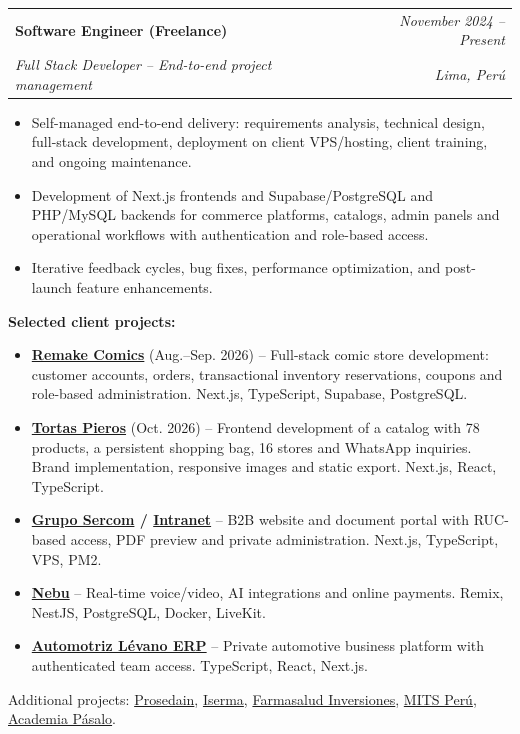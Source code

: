 \documentclass[a4paper,10pt]{article}
\makeatletter
\newcommand{\cvsubheading}[4]{
  \vspace{2pt}
  \begin{tabularx}{\textwidth}{@{}X r@{}}
    \textbf{#1} & \textit{\small #2} \\
    \textit{\small\color{graytext} #3} & \textit{\small\color{graytext} #4} \\
  \end{tabularx}\vspace{-2pt}
}
\makeatother
\begin{document}
\cvsubheading
  {Software Engineer (Freelance)}{November 2024 -- Present}
  {Full Stack Developer -- End-to-end project management}{Lima, Per\'u}

\begin{itemize}[leftmargin=16pt, itemsep=1.5pt, parsep=0pt, topsep=3pt]
  \item Self-managed end-to-end delivery: requirements analysis, technical design, full-stack development, deployment on client VPS/hosting, client training, and ongoing maintenance.
  \item Development of Next.js frontends and Supabase/PostgreSQL and PHP/MySQL backends for commerce platforms, catalogs, admin panels and operational workflows with authentication and role-based access.
  \item Iterative feedback cycles, bug fixes, performance optimization, and post-launch feature enhancements.
\end{itemize}

\vspace{2pt}
{\small\textbf{Selected client projects:}}
\begin{itemize}[leftmargin=16pt, itemsep=1.5pt, parsep=0pt, topsep=2pt]
  \item \textbf{\href{https://remake.johanamador.com/}{Remake Comics}} (Aug.--Sep. 2026) -- Full-stack comic store development: customer accounts, orders, transactional inventory reservations, coupons and role-based administration. Next.js, TypeScript, Supabase, PostgreSQL.
  \item \textbf{\href{https://pieros.johanamador.com/}{Tortas Pieros}} (Oct. 2026) -- Frontend development of a catalog with 78 products, a persistent shopping bag, 16 stores and WhatsApp inquiries. Brand implementation, responsive images and static export. Next.js, React, TypeScript.
  \item \textbf{\href{https://gruposercom.pe}{Grupo Sercom} / \href{https://intranet.gruposercom.pe}{Intranet}} -- B2B website and document portal with RUC-based access, PDF preview and private administration. Next.js, TypeScript, VPS, PM2.
  \item \textbf{\href{https://flow-telligence.com}{Nebu}} -- Real-time voice/video, AI integrations and online payments. Remix, NestJS, PostgreSQL, Docker, LiveKit.
  \item \textbf{\href{https://mecanicalevano.org}{Automotriz Lévano ERP}} -- Private automotive business platform with authenticated team access. TypeScript, React, Next.js.
\end{itemize}
{\small\color{graytext} Additional projects: \href{https://prosedain.com}{Prosedain}, \href{https://www.isermaperu.com}{Iserma}, \href{https://farmasaludinversiones.com}{Farmasalud Inversiones}, \href{https://mitsperu.com}{MITS Perú}, \href{https://academiapasalo.com}{Academia Pásalo}.}
\end{document}
